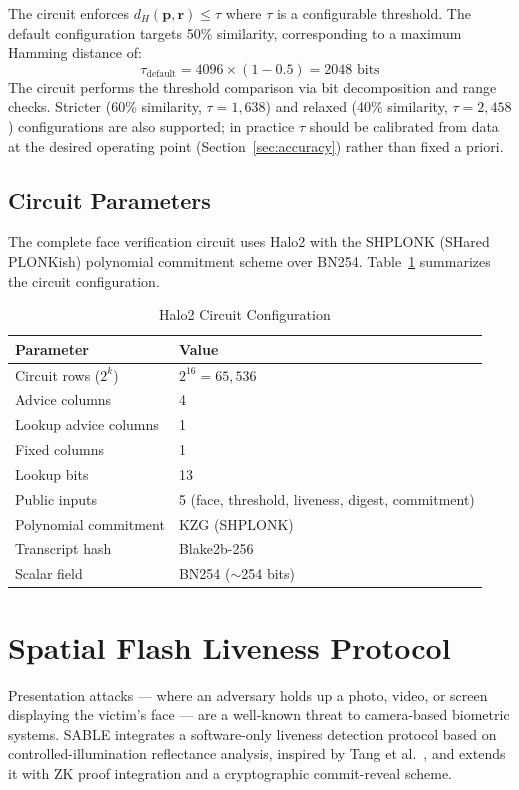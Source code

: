 \documentclass[conference]{IEEEtran}
\begin{document}
The circuit enforces $d_H(\mathbf{p}, \mathbf{r}) \leq \tau$ where $\tau$ is a configurable threshold. The default configuration targets 50\% similarity, corresponding to a maximum Hamming distance of:
\[
\tau_{\text{default}} = 4096 \times (1 - 0.5) = 2048 \text{ bits}
\]
The circuit performs the threshold comparison via bit decomposition and range checks. Stricter (60\% similarity, $\tau = 1{,}638$) and relaxed (40\% similarity, $\tau = 2{,}458$) configurations are also supported; in practice $\tau$ should be calibrated from data at the desired operating point (Section~\ref{sec:accuracy}) rather than fixed a priori.

\subsection{Circuit Parameters}

The complete face verification circuit uses Halo2 with the SHPLONK (SHared PLONKish) polynomial commitment scheme over BN254. Table~\ref{tab:circuit} summarizes the circuit configuration.

\begin{table}[t]
\centering
\caption{Halo2 Circuit Configuration}
\label{tab:circuit}
\begin{tabular}{@{}ll@{}}
\toprule
Parameter & Value \\
\midrule
Circuit rows ($2^k$) & $2^{16} = 65{,}536$ \\
Advice columns & 4 \\
Lookup advice columns & 1 \\
Fixed columns & 1 \\
Lookup bits & 13 \\
Public inputs & 5 (face, threshold, liveness, digest, commitment) \\
Polynomial commitment & KZG (SHPLONK) \\
Transcript hash & Blake2b-256 \\
Scalar field & BN254 ($\sim$254 bits) \\
\bottomrule
\end{tabular}
\end{table}

\section{Spatial Flash Liveness Protocol}
\label{sec:liveness}

Presentation attacks --- where an adversary holds up a photo, video, or screen displaying the victim's face --- are a well-known threat to camera-based biometric systems. SABLE integrates a software-only liveness detection protocol based on controlled-illumination reflectance analysis, inspired by Tang et al.~\cite{tang2018}, and extends it with ZK proof integration and a cryptographic commit-reveal scheme.
\end{document}
